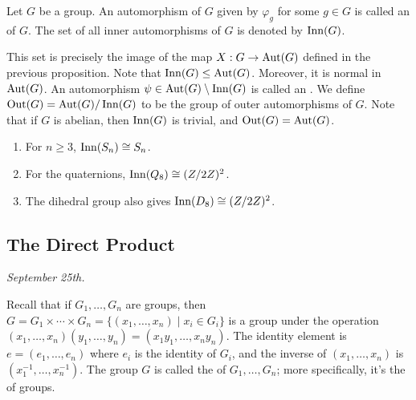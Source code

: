 \begin{definition}
    Let $G$ be a group. An automorphism of $G$ given by $\varphi_{g}$ for some $g \in G$ is called an  of $G$. The set of all inner automorphisms of $G$ is denoted by $\operatorname{Inn}(G)$.
\end{definition}
This set is precisely the image of the map $X:G \to \operatorname{Aut}(G)$ defined in the previous proposition. Note that $\operatorname{Inn}(G) \leq \operatorname{Aut}(G)$. Moreover, it is normal in $\operatorname{Aut}(G)$. An automorphism $\psi \in \operatorname{Aut}(G)\setminus \operatorname{Inn}(G)$ is called an . We define $\operatorname{Out}(G) = \operatorname{Aut}(G)/\operatorname{Inn}(G)$ to be the group of outer automorphisms of $G$. Note that if $G$ is abelian, then $\operatorname{Inn}(G)$ is trivial, and $\operatorname{Out}(G) = \operatorname{Aut}(G)$.

\begin{example}
    \begin{enumerate}
        \item For $n \geq 3$, $\operatorname{Inn}(S_{n}) \cong S_{n}$.
        \item For the quaternions, $\operatorname{Inn}(Q_{8}) \cong (Z/2Z)^{2}$.
        \item The dihedral group also gives $\operatorname{Inn}(D_{8}) \cong (Z/2Z)^{2}$.
    \end{enumerate}
\end{example}

\subsection{The Direct Product}
\textit{September 25th.}

Recall that if $G_{1},\ldots,G_{n}$ are groups, then $G = G_{1} \times \cdots \times G_{n} = \{(x_{1},\ldots,x_{n}) \mid x_{i} \in G_{i}\}$ is a group under the operation $(x_{1},\ldots,x_{n})(y_{1},\ldots,y_{n}) = (x_{1}y_{1},\ldots,x_{n}y_{n})$. The identity element is $e = (e_{1},\ldots,e_{n})$ where $e_{i}$ is the identity of $G_{i}$, and the inverse of $(x_{1},\ldots,x_{n})$ is $(x_{1}^{-1},\ldots,x_{n}^{-1})$. The group $G$ is called the  of $G_{1},\ldots,G_{n}$; more specifically, it's the  of groups.

